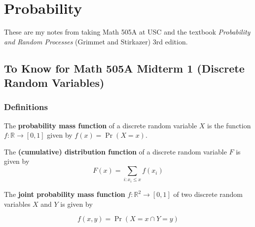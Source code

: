 %
%
%
%
%
%
%
%
%
%
%
%
%

\section{Probability}

These are my notes from taking Math 505A at USC and the textbook \textit{Probability and Random Processes} (Grimmet and Stirkazer) 3rd edition.

\subsection{To Know for Math 505A Midterm 1 (Discrete Random Variables)}

\subsubsection{Definitions}

\begin{definition}The \textbf{probability mass function} of a discrete random variable \(X\) is the function \(f: \mathbb{R} \to [0,1]\) given by \(f(x) = \Pr(X = x)\). \end{definition}

\begin{definition}The \textbf{(cumulative) distribution function} of a discrete random variable \(F\) is given by \[F(x) = \sum_{i:x_i \leq x} f(x_i)\] \end{definition}

\begin{definition}The \textbf{joint probability mass function} \(f: \mathbb{R}^2 \to [0, 1]\) of two discrete random variables \(X\) and \(Y\) is given by

\[
f(x, y) = \Pr(X = x \cap Y = y)
\] \end{definition}

